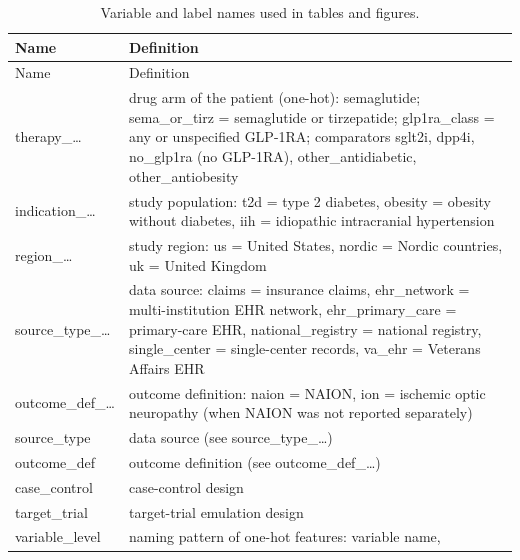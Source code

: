 \documentclass[
  11pt,
]{article}
\begin{document}
\begin{longtable}[]{@{}
  >{\raggedright\arraybackslash}p{}
  >{\raggedright\arraybackslash}p{}@{}}
\caption{Variable and label names used in tables and
figures.}\tabularnewline
\toprule\noalign{}
\begin{minipage}[b]{\linewidth}\raggedright
Name
\end{minipage} & \begin{minipage}[b]{\linewidth}\raggedright
Definition
\end{minipage} \\
\midrule\noalign{}
\endfirsthead
\toprule\noalign{}
\begin{minipage}[b]{\linewidth}\raggedright
Name
\end{minipage} & \begin{minipage}[b]{\linewidth}\raggedright
Definition
\end{minipage} \\
\midrule\noalign{}
\endhead
\bottomrule\noalign{}
\endlastfoot
therapy\_\ldots{} & drug arm of the patient (one-hot): semaglutide;
sema\_or\_tirz = semaglutide or tirzepatide; glp1ra\_class = any or
unspecified GLP-1RA; comparators sglt2i, dpp4i, no\_glp1ra (no GLP-1RA),
other\_antidiabetic, other\_antiobesity \\
indication\_\ldots{} & study population: t2d = type 2 diabetes, obesity
= obesity without diabetes, iih = idiopathic intracranial
hypertension \\
region\_\ldots{} & study region: us = United States, nordic = Nordic
countries, uk = United Kingdom \\
source\_type\_\ldots{} & data source: claims = insurance claims,
ehr\_network = multi-institution EHR network, ehr\_primary\_care =
primary-care EHR, national\_registry = national registry, single\_center
= single-center records, va\_ehr = Veterans Affairs EHR \\
outcome\_def\_\ldots{} & outcome definition: naion = NAION, ion =
ischemic optic neuropathy (when NAION was not reported separately) \\
source\_type & data source (see source\_type\_\ldots) \\
outcome\_def & outcome definition (see outcome\_def\_\ldots) \\
case\_control & case-control design \\
target\_trial & target-trial emulation design \\
variable\_level & naming pattern of one-hot features: variable name,

\end{longtable}
\end{document}

